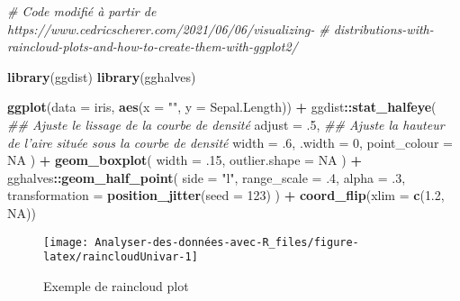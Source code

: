\documentclass[
  french,
]{book}
\newenvironment{Shaded}{\begin{snugshade}}{\end{snugshade}}
\newcommand{\CommentTok}[1]{\textcolor[rgb]{0.56,0.35,0.01}{\textit{#1}}}
\newcommand{\DataTypeTok}[1]{\textcolor[rgb]{0.13,0.29,0.53}{#1}}
\newcommand{\DecValTok}[1]{\textcolor[rgb]{0.00,0.00,0.81}{#1}}
\newcommand{\FloatTok}[1]{\textcolor[rgb]{0.00,0.00,0.81}{#1}}
\newcommand{\KeywordTok}[1]{\textcolor[rgb]{0.13,0.29,0.53}{\textbf{#1}}}
\newcommand{\NormalTok}[1]{#1}
\newcommand{\OperatorTok}[1]{\textcolor[rgb]{0.81,0.36,0.00}{\textbf{#1}}}
\newcommand{\OtherTok}[1]{\textcolor[rgb]{0.56,0.35,0.01}{#1}}
\newcommand{\StringTok}[1]{\textcolor[rgb]{0.31,0.60,0.02}{#1}}
\begin{document}
\begin{Shaded}
\begin{Highlighting}[]
\CommentTok{# Code modifié à partir de https://www.cedricscherer.com/2021/06/06/visualizing-}
\CommentTok{# distributions-with-raincloud-plots-and-how-to-create-them-with-ggplot2/}

\KeywordTok{library}\NormalTok{(ggdist)}
\KeywordTok{library}\NormalTok{(gghalves)}

\KeywordTok{ggplot}\NormalTok{(}\DataTypeTok{data =}\NormalTok{ iris, }\KeywordTok{aes}\NormalTok{(}\DataTypeTok{x =} \StringTok{""}\NormalTok{, }\DataTypeTok{y =}\NormalTok{ Sepal.Length)) }\OperatorTok{+}\StringTok{ }
\StringTok{  }\NormalTok{ggdist}\OperatorTok{::}\KeywordTok{stat_halfeye}\NormalTok{(}
    \CommentTok{## Ajuste le lissage de la courbe de densité}
    \DataTypeTok{adjust =} \FloatTok{.5}\NormalTok{, }
    \CommentTok{## Ajuste la hauteur de l'aire située sous la courbe de densité}
    \DataTypeTok{width =} \FloatTok{.6}\NormalTok{, }
    \DataTypeTok{.width =} \DecValTok{0}\NormalTok{, }
    \DataTypeTok{point_colour =} \OtherTok{NA}
\NormalTok{    ) }\OperatorTok{+}\StringTok{ }
\StringTok{  }\KeywordTok{geom_boxplot}\NormalTok{(}
    \DataTypeTok{width =} \FloatTok{.15}\NormalTok{, }
    \DataTypeTok{outlier.shape =} \OtherTok{NA}
\NormalTok{  ) }\OperatorTok{+}
\StringTok{  }\NormalTok{gghalves}\OperatorTok{::}\KeywordTok{geom_half_point}\NormalTok{(}
    \DataTypeTok{side =} \StringTok{"l"}\NormalTok{, }
    \DataTypeTok{range_scale =} \FloatTok{.4}\NormalTok{, }
    \DataTypeTok{alpha =} \FloatTok{.3}\NormalTok{,}
    \DataTypeTok{transformation =} \KeywordTok{position_jitter}\NormalTok{(}\DataTypeTok{seed =} \DecValTok{123}\NormalTok{)}
\NormalTok{  ) }\OperatorTok{+}
\StringTok{  }\KeywordTok{coord_flip}\NormalTok{(}\DataTypeTok{xlim =} \KeywordTok{c}\NormalTok{(}\FloatTok{1.2}\NormalTok{, }\OtherTok{NA}\NormalTok{)) }
\end{Highlighting}
\end{Shaded}

\begin{figure}

{\centering \texttt{[image: Analyser-des-données-avec-R\_files/figure-latex/raincloudUnivar-1]} 

}

\caption{Exemple de raincloud plot}\label{fig:raincloudUnivar}
\end{figure}
\end{document}
